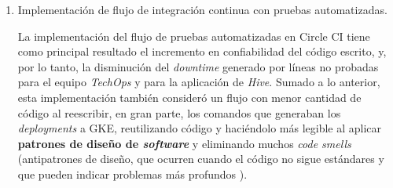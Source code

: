 \begin{enumerate}
    \item Implementación de flujo de integración continua con pruebas automatizadas.
    
    La implementación del flujo de pruebas automatizadas en Circle CI tiene como principal resultado el incremento en confiabilidad del código escrito, y, por lo tanto, la disminución del \textit{downtime} generado por líneas no probadas para el equipo \textit{TechOps} y para la aplicación de \textit{Hive}. Sumado a lo anterior, esta implementación también consideró un flujo con menor cantidad de código al reescribir, en gran parte, los comandos que generaban los \textit{deployments} a GKE, reutilizando código y haciéndolo más legible al aplicar \textbf{patrones de diseño de \textit{software}} y eliminando muchos \textit{code smells} (antipatrones de diseño, que ocurren cuando el código no sigue estándares y que pueden indicar problemas más profundos \cite{code_smells}).

  \end{enumerate}
 